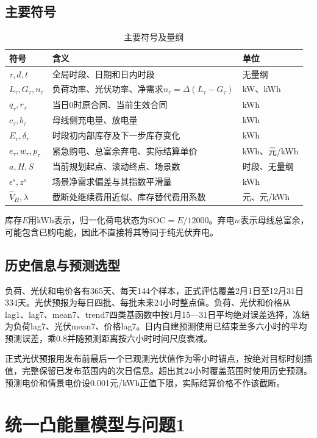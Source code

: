 \documentclass[UTF8,a4paper,zihao=-4,fontset=mac]{ctexart}
\begin{document}
\subsection{主要符号}
\begin{table}[H]\centering\small\caption{主要符号及量纲}
\begin{tabular}{p{2.2cm}p{9.0cm}l}\toprule
符号&含义&单位\\\midrule
$\tau,d,t$&全局时段、日期和日内时段&无量纲\\
$L_\tau,G_\tau,n_\tau$&负荷功率、光伏功率、净需求$n_\tau=\Delta(L_\tau-G_\tau)$&kW、kWh\\
$q_\tau,r_\tau$&当日0时原合同、当前生效合同&kWh\\
$c_\tau,b_\tau$&母线侧充电量、放电量&kWh\\
$E_\tau,\delta_\tau$&时段初内部库存及下一步库存变化&kWh\\
$e_\tau,w_\tau,p_\tau$&紧急购电、总富余弃电、实际结算单价&kWh、元/kWh\\
$a,H,S$&当前规划起点、滚动终点、场景数&时段、无量纲\\
$\epsilon^s,z^s$&场景净需求偏差与其指数平滑量&kWh\\
$\widehat V_H,\lambda$&截断处继续费用近似、库存替代费用系数&元、元/kWh\\\bottomrule
\end{tabular}\end{table}
库存$E$用kWh表示，归一化荷电状态为$\mathrm{SOC}=E/12000$。弃电$w$表示母线总富余，可能包含已购电能，因此不直接将其等同于纯光伏弃电。

\subsection{历史信息与预测选型}
负荷、光伏和电价各有365天、每天144个样本，正式评估覆盖2月1日至12月31日334天。光伏预报为每日四批、每批未来24小时整点值。负荷、光伏和价格从lag1、lag7、mean7、trend7四类基函数中按1月15—31日平均绝对误差选择，冻结为负荷lag7、光伏mean7、价格lag7。日内自建预测使用已结束至多六小时的平均预测误差，乘0.8并随预测距离按六小时时间尺度衰减。

正式光伏预报用发布前最后一个已观测光伏值作为零小时锚点，按绝对目标时刻插值，完整保留已发布范围内的次日信息。超出其24小时覆盖范围时使用历史预测。预测电价和情景电价设0.001元/kWh正值下限，实际结算价格不作该截断。

\section{统一凸能量模型与问题1}
\end{document}
